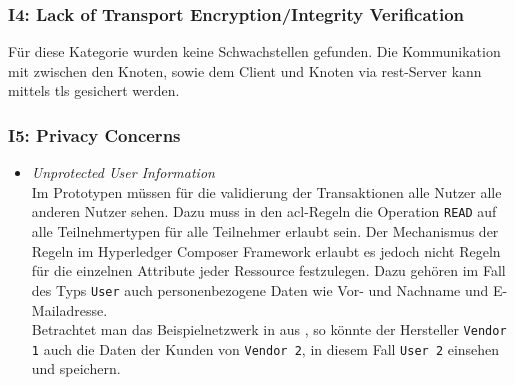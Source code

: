         \subsubsection*{I4: Lack of Transport Encryption/Integrity Verification}
            Für diese Kategorie wurden keine Schwachstellen gefunden. 
            Die Kommunikation mit zwischen den Knoten, sowie dem Client und Knoten via \gls{rest}-Server kann mittels \gls{tls} gesichert werden.
            
        \subsubsection*{I5: Privacy Concerns}
            \begin{itemize}[leftmargin=0cm,label={}]
                \item \emph{Unprotected User Information}\label{vuln:prototype_userdata}\\
                    Im Prototypen müssen für die validierung der Transaktionen alle Nutzer alle anderen Nutzer sehen. 
                    Dazu muss in den \gls{acl}-Regeln die Operation \colorbox{light-gray}{\lstinline{READ}} auf alle Teilnehmertypen für alle Teilnehmer erlaubt sein. 
                    Der Mechanismus der Regeln im Hyperledger Composer Framework erlaubt es jedoch nicht Regeln für die einzelnen Attribute jeder Ressource festzulegen. 
                    Dazu gehören im Fall des Typs \colorbox{light-gray}{\lstinline{User}} auch personenbezogene Daten wie Vor- und Nachname und E-Mailadresse.\\
                    Betrachtet man das Beispielnetzwerk in  aus , so könnte der Hersteller \colorbox{light-gray}{\lstinline{Vendor 1}} auch die Daten der Kunden von \colorbox{light-gray}{\lstinline{Vendor 2}}, in diesem Fall \colorbox{light-gray}{\lstinline{User 2}} einsehen und speichern.
            \end{itemize}
            
